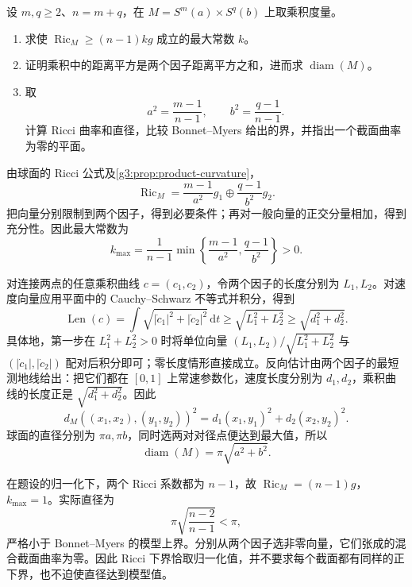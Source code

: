 \begin{exercise}\label{g3:ex:myers-product-diameter}
	设 \(m,q\ge2\)、\(n=m+q\)，在 \(M=S^m(a)\times S^q(b)\) 上取乘积度量。
	\begin{enumerate}
		\item 求使 \(\operatorname{Ric}_M\ge(n-1)k g\) 成立的最大常数 \(k\)。
		\item 证明乘积中的距离平方是两个因子距离平方之和，进而求 \(\operatorname{diam}(M)\)。
		\item 取
		\[
			a^2=\frac{m-1}{n-1},\qquad b^2=\frac{q-1}{n-1}.
		\]
		计算 Ricci 曲率和直径，比较 Bonnet--Myers 给出的界，并指出一个截面曲率为零的平面。
	\end{enumerate}
\end{exercise}
\begin{solution}
	由球面的 Ricci 公式及\cref{g3:prop:product-curvature}，
	\[
		\operatorname{Ric}_M
		=\frac{m-1}{a^2}g_1\oplus\frac{q-1}{b^2}g_2.
	\]
	把向量分别限制到两个因子，得到必要条件；再对一般向量的正交分量相加，得到充分性。因此最大常数为
	\[
		k_{\max}=\frac1{n-1}
		\min\left\{\frac{m-1}{a^2},\frac{q-1}{b^2}\right\}>0.
	\]

	对连接两点的任意乘积曲线 \(c=(c_1,c_2)\)，令两个因子的长度分别为 \(L_1,L_2\)。对速度向量应用平面中的 Cauchy--Schwarz 不等式并积分，得到
	\[
		\operatorname{Len}(c)
		=\int\sqrt{|\dot c_1|^2+|\dot c_2|^2}\,\mathrm{d}t
		\ge\sqrt{L_1^2+L_2^2}\ge\sqrt{d_1^2+d_2^2}.
	\]
	具体地，第一步在 \(L_1^2+L_2^2>0\) 时将单位向量 \((L_1,L_2)/\sqrt{L_1^2+L_2^2}\) 与 \((|\dot c_1|,|\dot c_2|)\) 配对后积分即可；零长度情形直接成立。反向估计由两个因子的最短测地线给出：把它们都在 \([0,1]\) 上常速参数化，速度长度分别为 \(d_1,d_2\)，乘积曲线的长度正是 \(\sqrt{d_1^2+d_2^2}\)。因此
	\[
		d_M((x_1,x_2),(y_1,y_2))^2
		=d_1(x_1,y_1)^2+d_2(x_2,y_2)^2.
	\]
	球面的直径分别为 \(\pi a,\pi b\)，同时选两对对径点便达到最大值，所以
	\[
		\operatorname{diam}(M)=\pi\sqrt{a^2+b^2}.
	\]

	在题设的归一化下，两个 Ricci 系数都为 \(n-1\)，故 \(\operatorname{Ric}_M=(n-1)g\)，\(k_{\max}=1\)。实际直径为
	\[
		\pi\sqrt{\frac{n-2}{n-1}}<\pi,
	\]
	严格小于 Bonnet--Myers 的模型上界。分别从两个因子选非零向量，它们张成的混合截面曲率为零。因此 Ricci 下界恰取归一化值，并不要求每个截面都有同样的正下界，也不迫使直径达到模型值。
\end{solution}

